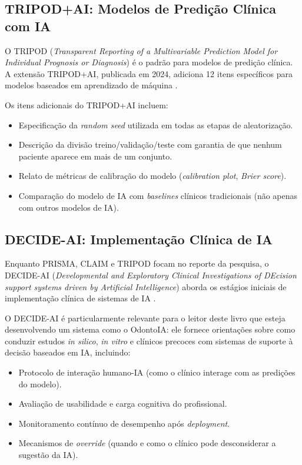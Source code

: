 \subsection{TRIPOD+AI: Modelos de Predição Clínica com IA}

O TRIPOD (\textit{Transparent Reporting of a Multivariable Prediction Model for
Individual Prognosis or Diagnosis}) é o padrão para modelos de predição clínica.
A extensão TRIPOD+AI, publicada em 2024, adiciona 12 itens específicos para
modelos baseados em aprendizado de máquina \cite{collins2024tripod}.

Os itens adicionais do TRIPOD+AI incluem:

\begin{itemize}
  \item Especificação da \textit{random seed} utilizada em todas as etapas de
    aleatorização.
  \item Descrição da divisão treino/validação/teste com garantia de que nenhum
    paciente aparece em mais de um conjunto.
  \item Relato de métricas de calibração do modelo (\textit{calibration plot},
    \textit{Brier score}).
  \item Comparação do modelo de IA com \textit{baselines} clínicos tradicionais
    (não apenas com outros modelos de IA).
\end{itemize}

\subsection{DECIDE-AI: Implementação Clínica de IA}

Enquanto PRISMA, CLAIM e TRIPOD focam no reporte da pesquisa, o DECIDE-AI
(\textit{Developmental and Exploratory Clinical Investigations of DEcision
support systems driven by Artificial Intelligence}) aborda os estágios iniciais
de implementação clínica de sistemas de IA \cite{vasey2021decide}.

O DECIDE-AI é particularmente relevante para o leitor deste livro que esteja
desenvolvendo um sistema como o OdontoIA: ele fornece orientações sobre como
conduzir estudos \textit{in silico}, \textit{in vitro} e clínicos precoces com
sistemas de suporte à decisão baseados em IA, incluindo:

\begin{itemize}
  \item Protocolo de interação humano-IA (como o clínico interage com as
    predições do modelo).
  \item Avaliação de usabilidade e carga cognitiva do profissional.
  \item Monitoramento contínuo de desempenho após \textit{deployment}.
  \item Mecanismos de \textit{override} (quando e como o clínico pode
    desconsiderar a sugestão da IA).
\end{itemize}

